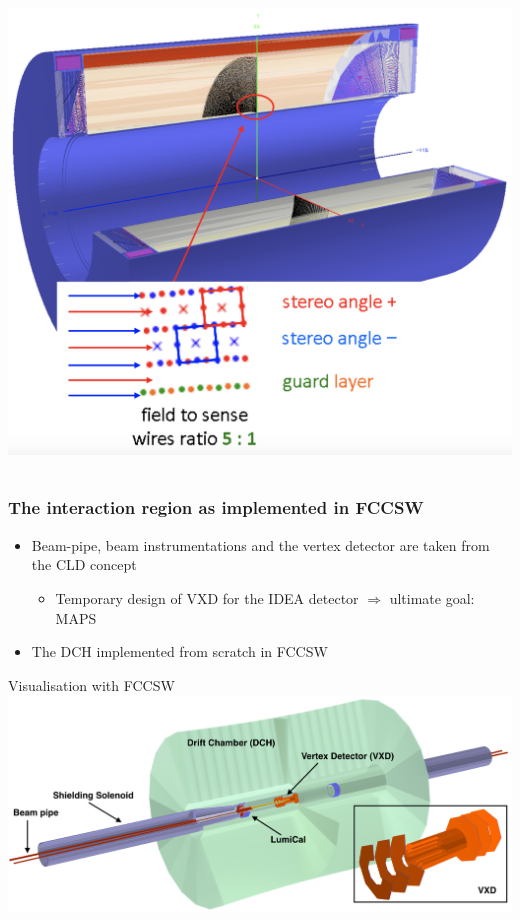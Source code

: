 \documentclass[aspectratio=169, hyperref={colorlinks=true,pdfpagelabels=false,linkcolor=black}, xcolor=dvipsnames,10pt]{beamer}
\begin{document}
\begin{frame}
\begin{columns}
	
	\centering
	\includegraphics[width=\textwidth]{../figures/DriftChamber.png}
	\end{columns}
	
\end{frame}


\begin{frame}
	\frametitle{The interaction region as implemented in FCCSW}
	
	\begin{itemize}
	\item Beam-pipe, beam instrumentations and the vertex detector are taken from the CLD concept
		\begin{itemize}
		\item Temporary design of VXD for the IDEA detector $\Rightarrow $ ultimate goal: MAPS
		\end{itemize}
	\item The DCH implemented from scratch in FCCSW
	\end{itemize}
	
	\begin{block}{Visualisation with FCCSW}
	\centering
	\includegraphics[width=\textwidth]{../figures/FCCeeIDEA_IR_description_zoomVXD.png}
	\end{block}

\end{frame}
\end{document}
